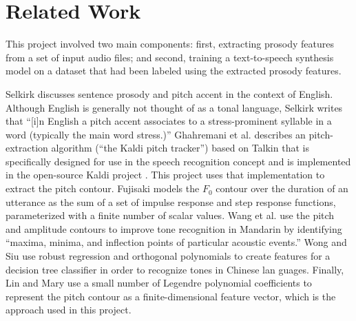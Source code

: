 \documentclass{article}
\begin{document}
\section{Related Work}
\label{sec:sota}

This project involved two main components: first, extracting prosody features from a set of input audio files; and second, training a text-to-speech synthesis model on a dataset that had been labeled using the extracted prosody features.

Selkirk \cite{selkirk1995sentence} discusses sentence prosody and pitch accent in the context of English. Although English is generally not thought of as a tonal language, Selkirk writes that ``[i]n English a pitch accent associates to a stress-prominent syllable in a word (typically the main word stress.)''
Ghahremani et al. \cite{ghahremani2014pitch} describes an pitch-extraction algorithm (``the Kaldi pitch tracker'') based on Talkin \cite{talkin1995robust} that is specifically designed for use in the speech recognition concept and is implemented in the open-source Kaldi project \cite{}. This project uses that implementation to extract the pitch contour.
Fujisaki \cite{fujisaki2004information} models the $F_0$ contour over the duration of an utterance as the sum of a set of impulse response and step response functions, parameterized with a finite number of scalar values.
Wang et al. \cite{wang2008mandarin} use the pitch and amplitude contours to improve tone recognition in Mandarin by identifying ``maxima, minima, and inflection points of particular acoustic events.''
Wong and Siu \cite{pui2004decision} use robust regression and orthogonal polynomials to create features for a decision tree classifier in order to recognize tones in Chinese lan guages. Finally, Lin \cite{lin2005language} and Mary \cite{mary2011extraction} use a small number of Legendre polynomial coefficients to represent the pitch contour as a finite-dimensional feature vector, which is the approach used in this project.
\end{document}
